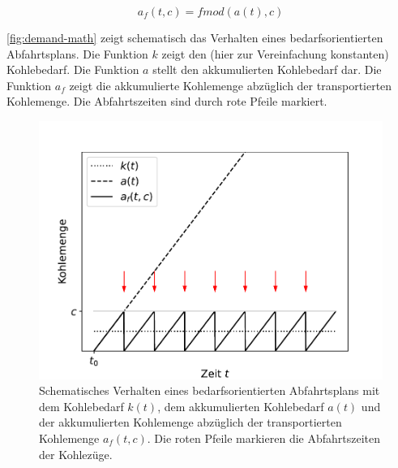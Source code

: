 \begin{equation}
    a_f(t, c)=fmod(a(t), c)\label{eq:kohle-fmod}
\end{equation}

\autoref{fig:demand-math} zeigt schematisch das Verhalten eines bedarfsorientierten Abfahrtsplans. Die Funktion $k$ zeigt den (hier zur Vereinfachung konstanten) Kohlebedarf. Die Funktion $a$ stellt den akkumulierten Kohlebedarf dar. Die Funktion $a_f$ zeigt die akkumulierte Kohlemenge abzüglich der transportierten Kohlemenge. Die Abfahrtszeiten sind durch rote Pfeile markiert.

\begin{figure}[!ht]
	\centering
	\includegraphics[width=1.0\linewidth]{images/demand-math.pdf}
	\caption{Schematisches Verhalten eines bedarfsorientierten Abfahrtsplans mit dem Kohlebedarf $k(t)$, dem akkumulierten Kohlebedarf $a(t)$ und der akkumulierten Kohlemenge abzüglich der transportierten Kohlemenge $a_f(t,c)$. Die roten Pfeile markieren die Abfahrtszeiten der Kohlezüge.}
	\label{fig:demand-math}
\end{figure}